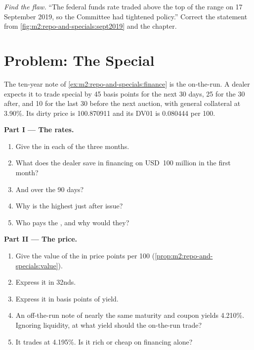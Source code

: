 \begin{exercise}[$\star\star\star$]\label{exo:m2:repo-and-specials:8}
\emph{Find the flaw.} ``The federal funds rate traded above the top of the
range on 17 September 2019, so the Committee had tightened policy.'' Correct
the statement from \cref{fig:m2:repo-and-specials:sept2019} and the chapter.
\end{exercise}

\section{Problem: The Special}

\begin{problem}\label{pb:m2:repo-and-specials:1}
The ten-year note of \cref{ex:m2:repo-and-specials:finance} is the
on-the-run. A dealer expects it to trade special by 45 basis points for the
next 30 days, 25 for the 30 after, and 10 for the last 30 before the next
auction, with general collateral at 3.90\%. Its dirty price is 100.870911 and its
DV01 is 0.080444 per 100.

\medskip\noindent\textbf{Part I --- The rates.}
\begin{enumerate}
\item Give the  in each of the three months.
\item What does the dealer save in financing on USD~100 million in the first
month?
\item And over the 90 days?
\item Why is the  highest just after issue?
\item Who pays the , and why would they?
\end{enumerate}

\medskip\noindent\textbf{Part II --- The price.}
\begin{enumerate}[resume]
\item Give the value of the  in price points per 100
(\cref{prop:m2:repo-and-specials:value}).
\item Express it in 32nds.
\item Express it in basis points of yield.
\item An off-the-run note of nearly the same maturity and coupon yields 4.210\%.
Ignoring liquidity, at what yield should the on-the-run trade?
\item It trades at 4.195\%. Is it rich or cheap on financing alone?
\end{enumerate}


\end{problem}
